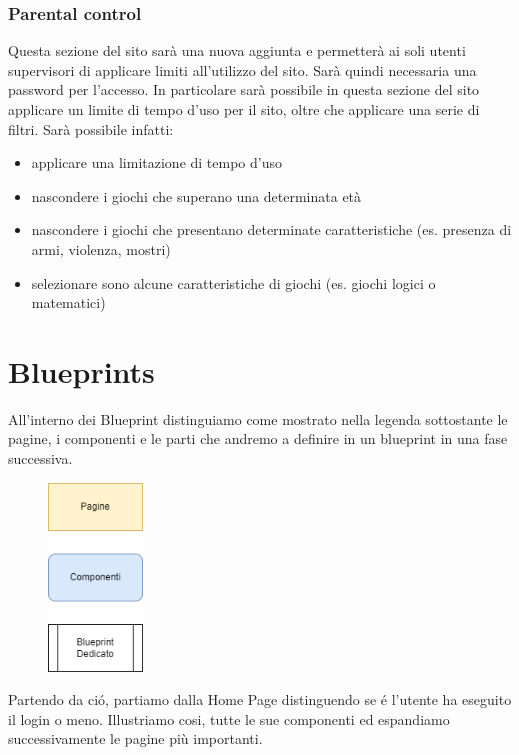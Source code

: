 \documentclass[../Report.tex]{subfiles}
\begin{document}
    \subsubsection{Parental control}
    Questa sezione del sito sarà una nuova aggiunta e permetterà ai soli utenti supervisori di applicare limiti all'utilizzo del sito. Sarà quindi necessaria una password per l'accesso. In particolare sarà possibile in questa sezione del sito applicare un limite di tempo d'uso per il sito, oltre che applicare una serie di filtri. Sarà possibile infatti:
    \begin{itemize}
        \item applicare una limitazione di tempo d'uso 
        \item nascondere i giochi che superano una determinata età
        \item nascondere i giochi che presentano determinate caratteristiche (es. presenza di armi, violenza, mostri)
        \item selezionare sono alcune caratteristiche di giochi (es. giochi logici o matematici)
    \end{itemize}
    
    \section{Blueprints}
    All'interno dei Blueprint distinguiamo come mostrato nella legenda sottostante le pagine, i componenti e le parti che andremo a definire in un blueprint in una fase successiva.
    \begin{figure}[H]
        \includegraphics[height=5cm]{Legenda.png}
        \centering
    \end{figure}

    Partendo da ció, partiamo dalla Home Page distinguendo se é l'utente ha eseguito il login o meno.
    Illustriamo cosi, tutte le sue componenti ed espandiamo successivamente le pagine più importanti.
\end{document}
